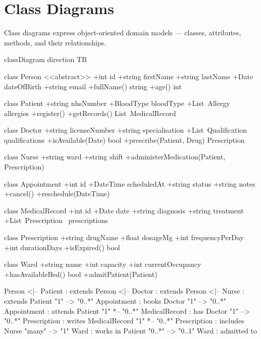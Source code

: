 \documentclass[12pt, a4paper]{article}
\begin{document}
\section{Class Diagrams}

Class diagrams express object-oriented domain models — classes,
attributes, methods, and their relationships.

\begin{mermaid}[
    type    = class,
    theme   = arctic,
    caption = {Hospital management system — domain class model},
    label   = {fig:hospital},
    width   = \linewidth
]
classDiagram
    direction TB

    class Person {
        <<abstract>>
        +int id
        +string firstName
        +string lastName
        +Date dateOfBirth
        +string email
        +fullName() string
        +age() int
    }

    class Patient {
        +string nhsNumber
        +BloodType bloodType
        +List~Allergy~ allergies
        +register()
        +getRecords() List~MedicalRecord~
    }

    class Doctor {
        +string licenseNumber
        +string specialisation
        +List~Qualification~ qualifications
        +isAvailable(Date) bool
        +prescribe(Patient, Drug) Prescription
    }

    class Nurse {
        +string ward
        +string shift
        +administerMedication(Patient, Prescription)
    }

    class Appointment {
        +int id
        +DateTime scheduledAt
        +string status
        +string notes
        +cancel()
        +reschedule(DateTime)
    }

    class MedicalRecord {
        +int id
        +Date date
        +string diagnosis
        +string treatment
        +List~Prescription~ prescriptions
    }

    class Prescription {
        +string drugName
        +float dosageMg
        +int frequencyPerDay
        +int durationDays
        +isExpired() bool
    }

    class Ward {
        +string name
        +int capacity
        +int currentOccupancy
        +hasAvailableBed() bool
        +admitPatient(Patient)
    }

    Person  <|-- Patient      : extends
    Person  <|-- Doctor       : extends
    Person  <|-- Nurse        : extends
    Patient "1" --> "0..*" Appointment   : books
    Doctor  "1" --> "0..*" Appointment   : attends
    Patient "1" *-- "0..*" MedicalRecord : has
    Doctor  "1" --> "0..*" Prescription  : writes
    MedicalRecord "1" *-- "0..*" Prescription : includes
    Nurse   "many" --> "1" Ward          : works in
    Patient "0..*" --> "0..1" Ward       : admitted to
\end{mermaid}
\end{document}
